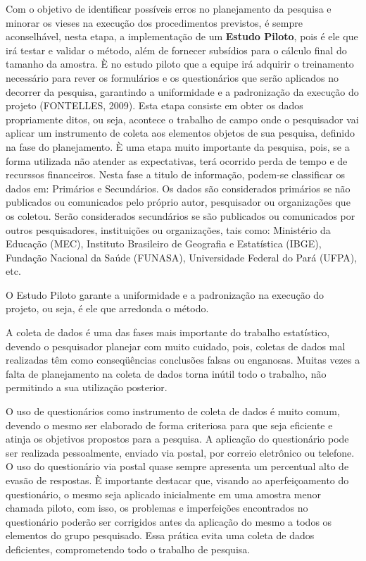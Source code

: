 Com o objetivo de identificar possíveis erros no planejamento da
pesquisa e minorar os vieses na execução dos procedimentos
previstos, é sempre aconselhável, nesta etapa, a implementação de
um \textbf{Estudo Piloto}, pois é ele que irá testar e validar o método, além de fornecer subsídios para o cálculo final do tamanho da
amostra. È no estudo piloto que a equipe irá adquirir o
treinamento necessário para rever os formulários e os
questionários que serão aplicados no decorrer da pesquisa,
garantindo a uniformidade e a padronização da execução do projeto
(FONTELLES, 2009). Esta etapa consiste em obter os dados
propriamente ditos, ou seja, acontece o trabalho de campo onde o
pesquisador vai aplicar um instrumento de coleta aos elementos
objetos de sua pesquisa, definido na fase do planejamento. È uma
etapa muito importante da pesquisa, pois, se a forma utilizada não
atender as expectativas, terá ocorrido perda de tempo e de
recurssos financeiros. Nesta fase a titulo de informação, podem-se
classificar os dados em: Primários e Secundários. Os dados são
considerados primários se não publicados ou comunicados pelo
próprio autor, pesquisador ou organizações que os coletou. Serão
considerados secundários se são publicados ou comunicados por
outros pesquisadores, instituições ou organizações, tais como:
Ministério da Educação (MEC), Instituto Brasileiro de Geografia e
Estatística (IBGE), Fundação Nacional da Saúde (FUNASA),
Universidade Federal do Pará (UFPA), etc.\vskip0.3cm


O Estudo Piloto garante a uniformidade e a padronização na execução do projeto, ou seja, é ele que arredonda o método.\vskip0.3cm

A coleta de dados é uma das fases mais importante do trabalho estatístico, devendo o pesquisador planejar com muito cuidado, pois, coletas de dados mal realizadas têm como conseqüências conclusões falsas ou enganosas. Muitas vezes a falta de planejamento na coleta de dados torna inútil todo o trabalho, não permitindo a sua utilização posterior.\vskip0.3cm


O uso de questionários como instrumento de coleta de dados é muito comum, devendo o mesmo ser elaborado de forma criteriosa para que seja eficiente e atinja os objetivos propostos para a pesquisa. A aplicação do questionário pode ser realizada pessoalmente, enviado via postal, por correio eletrônico ou telefone. O uso do questionário via postal quase sempre apresenta um percentual alto de evasão de respostas. È importante destacar que, visando ao aperfeiçoamento do questionário, o mesmo seja aplicado inicialmente em uma amostra menor chamada piloto, com isso, os problemas e imperfeições encontrados no questionário poderão ser corrigidos antes da aplicação do mesmo a todos os elementos do grupo pesquisado. Essa prática evita uma coleta de dados deficientes, comprometendo todo o trabalho de pesquisa.\vskip0.3cm



